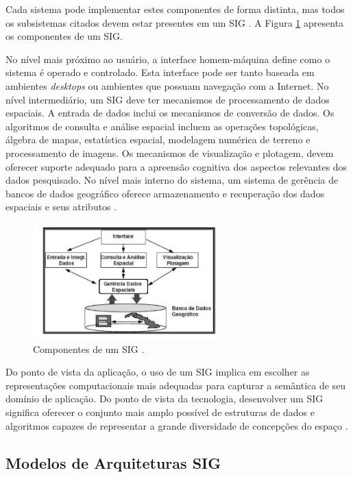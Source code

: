 Cada sistema pode implementar estes componentes de forma distinta, mas todos os subsistemas citados devem estar presentes em um SIG \cite{camara}. A Figura \ref{fig:ArquiteturaSIG} apresenta os componentes de um SIG.

No nível mais próximo ao usuário, a interface homem-máquina define como o sistema é operado e controlado. Esta interface pode ser tanto baseada em ambientes \textit{desktops} ou ambientes que possuam navegação com a Internet. No nível intermediário, um SIG deve ter mecanismos de processamento de dados espaciais. A entrada de dados inclui os mecanismos de conversão de dados. Os algoritmos de consulta e análise espacial incluem as operações topológicas, álgebra de mapas, estatística espacial, modelagem numérica de terreno e processamento de imagens. Os mecanismos de visualização e plotagem, devem oferecer suporte adequado para a apreensão cognitiva dos aspectos relevantes dos dados pesquisado. No nível mais interno do sistema, um sistema de gerência de bancos de dados geográfico oferece armazenamento e recuperação dos dados espaciais e seus atributos \cite{camara}.

\begin{figure}[h]
\centering
\includegraphics[width=0.65\textwidth]{./img/cap_III/1-ArquiteturaSIG}
\caption{Componentes de um SIG \cite{camara}.}
\label{fig:ArquiteturaSIG}
\end{figure}

Do ponto de vista da aplicação, o uso de um SIG implica em escolher as representações computacionais mais adequadas para capturar a semântica de seu domínio de aplicação. Do ponto de vista da tecnologia, desenvolver um SIG significa oferecer o conjunto mais amplo possível de estruturas de dados e algoritmos capazes de representar a grande diversidade de concepções do espaço \cite{camara}.

\subsection{Modelos de Arquiteturas SIG}

